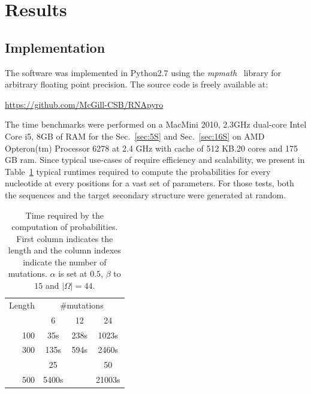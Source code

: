 \section{Results}
\label{sec:results}

\subsection{Implementation}
The software was implemented in Python2.7 using the \textit{mpmath}~\cite{mpmath} library
for  arbitrary floating point precision. The source code is freely available at:

{\centering \url{https://github.com/McGill-CSB/RNApyro}\\}

The time benchmarks were performed on a MacMini 2010, 2.3GHz dual-core Intel Core i5, 8GB of RAM for the Sec.~\ref{sec:5S} and Sec.~\ref{sec:16S} on AMD Opteron(tm) Processor 6278  at 2.4 GHz with cache of 512 KB.20 cores and 175 GB ram. 
Since typical use-cases of \RNApyro require
 efficiency and scalability, we present in Table~\ref{tab:time} typical runtimes required to compute the probabilities for  every nucleotide at every positions for a vast set of parameters. For those tests,
 both the sequences and the target secondary structure were generated at random.


\begin{table}[t]
\begin{minipage}{.4\textwidth}
\begin{tabular}{rccc}
Length &\multicolumn{3}{c}{\#mutations}\\\cline{2-4}
		 			  & 6   &  12  & 24\\\cline{2-4}
100  				& 35s  & 238s & 1023s\\
300  			& 135s & 594s &2460s\\\cline{2-4}
		 						& 25   &    &	50		\\\cline{2-4}
500         & 5400s&       &  21003s    \\
\end{tabular}
\end{minipage}
\begin{minipage}{.59\textwidth}
\caption{Time required by the computation of probabilities. First column indicates the length and  the column indexes indicate the number
 of mutations. $\alpha$ is
set at $0.5$,  $\beta$ to $15$ and $|\Omega|=44$.}
\label{tab:time}
\end{minipage}
\SpaceCheating
\end{table}


